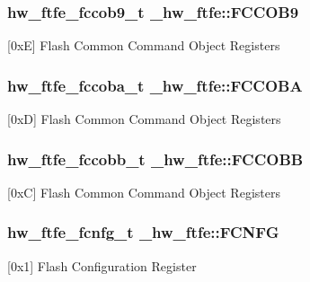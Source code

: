 \subsubsection[{\texorpdfstring{F\+C\+C\+O\+B9}{FCCOB9}}]{ {\bf hw\+\_\+ftfe\+\_\+fccob9\+\_\+t} \+\_\+hw\+\_\+ftfe\+::\+F\+C\+C\+O\+B9}\hypertarget{struct__hw__ftfe_a2c1e59504569b5abd0ec2fb2b3fd60bc}{}\label{struct__hw__ftfe_a2c1e59504569b5abd0ec2fb2b3fd60bc}
\mbox{[}0xE\mbox{]} Flash Common Command Object Registers 
\subsubsection[{\texorpdfstring{F\+C\+C\+O\+BA}{FCCOBA}}]{ {\bf hw\+\_\+ftfe\+\_\+fccoba\+\_\+t} \+\_\+hw\+\_\+ftfe\+::\+F\+C\+C\+O\+BA}\hypertarget{struct__hw__ftfe_a556c2e80b6b8f86015c29b1cf5dee775}{}\label{struct__hw__ftfe_a556c2e80b6b8f86015c29b1cf5dee775}
\mbox{[}0xD\mbox{]} Flash Common Command Object Registers 
\subsubsection[{\texorpdfstring{F\+C\+C\+O\+BB}{FCCOBB}}]{ {\bf hw\+\_\+ftfe\+\_\+fccobb\+\_\+t} \+\_\+hw\+\_\+ftfe\+::\+F\+C\+C\+O\+BB}\hypertarget{struct__hw__ftfe_ab83d2b2e372c6421580d18eceaf0e5bc}{}\label{struct__hw__ftfe_ab83d2b2e372c6421580d18eceaf0e5bc}
\mbox{[}0xC\mbox{]} Flash Common Command Object Registers 
\subsubsection[{\texorpdfstring{F\+C\+N\+FG}{FCNFG}}]{ {\bf hw\+\_\+ftfe\+\_\+fcnfg\+\_\+t} \+\_\+hw\+\_\+ftfe\+::\+F\+C\+N\+FG}\hypertarget{struct__hw__ftfe_a8ad8aa63f1cd335a4dcb2aedc391fb56}{}\label{struct__hw__ftfe_a8ad8aa63f1cd335a4dcb2aedc391fb56}
\mbox{[}0x1\mbox{]} Flash Configuration Register 
